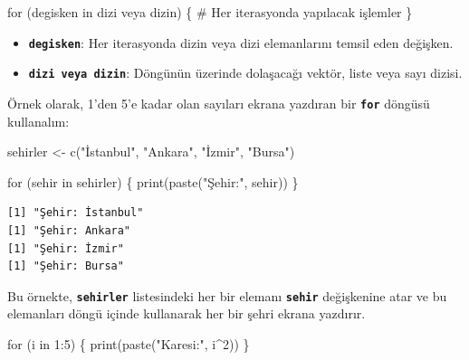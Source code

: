 \documentclass[
  letterpaper,
  DIV=11,
  numbers=noendperiod]{scrreprt}
\newenvironment{Shaded}{\begin{snugshade}}{\end{snugshade}}
\newcommand{\CommentTok}[1]{\textcolor[rgb]{0.37,0.37,0.37}{#1}}
\newcommand{\ControlFlowTok}[1]{\textcolor[rgb]{0.00,0.23,0.31}{#1}}
\newcommand{\DecValTok}[1]{\textcolor[rgb]{0.68,0.00,0.00}{#1}}
\newcommand{\FunctionTok}[1]{\textcolor[rgb]{0.28,0.35,0.67}{#1}}
\newcommand{\NormalTok}[1]{\textcolor[rgb]{0.00,0.23,0.31}{#1}}
\newcommand{\OtherTok}[1]{\textcolor[rgb]{0.00,0.23,0.31}{#1}}
\newcommand{\SpecialCharTok}[1]{\textcolor[rgb]{0.37,0.37,0.37}{#1}}
\newcommand{\StringTok}[1]{\textcolor[rgb]{0.13,0.47,0.30}{#1}}
\begin{document}
\begin{Shaded}
\begin{Highlighting}[]
\ControlFlowTok{for}\NormalTok{ (degisken }\ControlFlowTok{in}\NormalTok{ dizi veya dizin) \{}
  \CommentTok{\# Her iterasyonda yapılacak işlemler}
\NormalTok{\}}
\end{Highlighting}
\end{Shaded}

\begin{itemize}
\item
  \textbf{\texttt{degisken}}: Her iterasyonda dizin veya dizi
  elemanlarını temsil eden değişken.
\item
  \textbf{\texttt{dizi\ veya\ dizin}}: Döngünün üzerinde dolaşacağı
  vektör, liste veya sayı dizisi.
\end{itemize}

Örnek olarak, 1'den 5'e kadar olan sayıları ekrana yazdıran bir
\textbf{\texttt{for}} döngüsü kullanalım:

\begin{Shaded}
\begin{Highlighting}[]
\NormalTok{sehirler }\OtherTok{\textless{}{-}} \FunctionTok{c}\NormalTok{(}\StringTok{"İstanbul"}\NormalTok{, }\StringTok{"Ankara"}\NormalTok{, }\StringTok{"İzmir"}\NormalTok{, }\StringTok{"Bursa"}\NormalTok{)}

\ControlFlowTok{for}\NormalTok{ (sehir }\ControlFlowTok{in}\NormalTok{ sehirler) \{}
  \FunctionTok{print}\NormalTok{(}\FunctionTok{paste}\NormalTok{(}\StringTok{"Şehir:"}\NormalTok{, sehir))}
\NormalTok{\}}
\end{Highlighting}
\end{Shaded}

\begin{verbatim}
[1] "Şehir: İstanbul"
[1] "Şehir: Ankara"
[1] "Şehir: İzmir"
[1] "Şehir: Bursa"
\end{verbatim}

Bu örnekte, \textbf{\texttt{sehirler}} listesindeki her bir elemanı
\textbf{\texttt{sehir}} değişkenine atar ve bu elemanları döngü içinde
kullanarak her bir şehri ekrana yazdırır.

\begin{Shaded}
\begin{Highlighting}[]
\ControlFlowTok{for}\NormalTok{ (i }\ControlFlowTok{in} \DecValTok{1}\SpecialCharTok{:}\DecValTok{5}\NormalTok{) \{}
  \FunctionTok{print}\NormalTok{(}\FunctionTok{paste}\NormalTok{(}\StringTok{"Karesi:"}\NormalTok{, i}\SpecialCharTok{\^{}}\DecValTok{2}\NormalTok{))}
\NormalTok{\}}
\end{Highlighting}
\end{Shaded}
\end{document}
